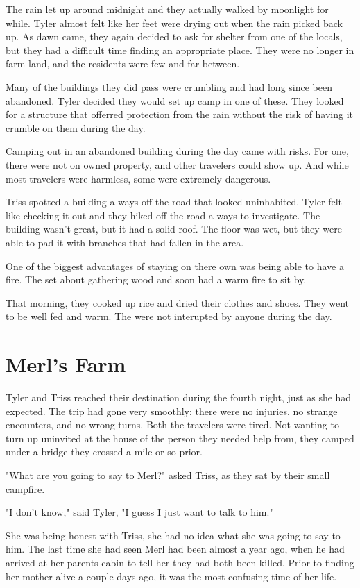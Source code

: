 \documentclass[courier]{sffms}
\begin{document}
The rain let up around midnight and they actually
walked by moonlight for while. Tyler almost
felt like her feet were drying out when the rain picked
back up. As dawn came, they again decided to
ask for shelter from one of the locals, but they had
a difficult time finding an appropriate place. They were
no longer in farm land, and the residents were few
and far between.

Many of the buildings they did pass were crumbling
and had long since been abandoned. Tyler decided
they would set up camp in one of these. They looked
for a structure that offerred protection from the rain
without the risk of having it crumble on them during
the day.

Camping out in an abandoned building during the
day came with risks. For one, there were not on 
owned property, and other travelers could show
up. And while most travelers were harmless, some
were extremely dangerous.

Triss spotted a building a ways off the road that
looked uninhabited. Tyler felt like checking it out
and they hiked off the road a ways to investigate.
The building wasn't great, but it had a solid roof.
The floor was wet, but they were able to pad it
with branches that had fallen in the area.

One of the biggest advantages of staying on there
own was being able to have a fire. The set about
gathering wood and soon had a warm fire to sit by.

That morning, they cooked up rice and dried their
clothes and shoes. They went to be well fed and
warm. The were not interupted by anyone during
the day.

\chapter{Merl's Farm}
Tyler and Triss reached their destination during
the fourth night, just as she had expected. The
trip had gone very smoothly; there were no
injuries, no strange encounters, and no wrong
turns. Both the travelers were tired. Not wanting
to turn up uninvited at the house of the person
they needed help from, they camped under a bridge
they crossed a mile or so prior.

"What are you going to say to Merl?" asked Triss,
as they sat by their small campfire.

"I don't know," said Tyler, "I guess I just want to
talk to him."

She was being honest with Triss, she had no idea
what she was going to say to him. The last time she
had seen Merl had been almost a year ago, when
he had arrived at her parents cabin to tell her they
had both been killed. Prior to finding her mother
alive a couple days ago, it was the most confusing
time of her life.
\end{document}

